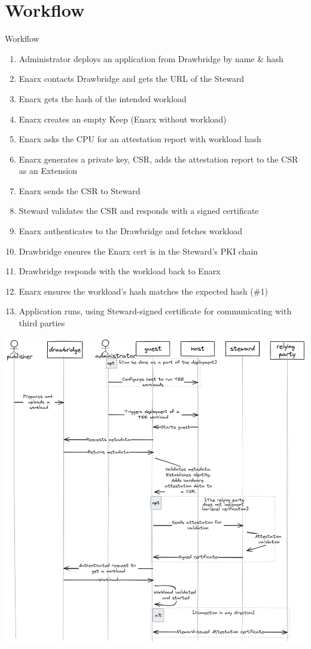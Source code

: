 \documentclass[graphics,compress]{beamer}
\begin{document}
\section{Workflow}
\begin{frame}{Workflow}
     {
        \begin{enumerate}
            \item Administrator deploys an application from Drawbridge by name \& hash
            \item Enarx contacts Drawbridge and gets the URL of the Steward
            \item Enarx gets the hash of the intended workload
            \item Enarx creates an empty Keep (Enarx without workload)
            \item Enarx asks the CPU for an attestation report with workload hash
            \item Enarx generates a private key, CSR, adds the attestation report to the CSR as an Extension
            \item Enarx sends the CSR to Steward
            \item Steward validates the CSR and responds with a signed certificate
            \item Enarx authenticates to the Drawbridge and fetches workload
            \item Drawbridge ensures the Enarx cert is in the Steward's PKI chain
            \item Drawbridge responds with the workload back to Enarx
            \item Enarx ensures the workload's hash matches the expected hash (\#1)
            \item Application runs, using Steward-signed certificate for communicating with third parties
        \end{enumerate}
    }
     {
        \centering
        \includegraphics[width=1.01\linewidth,height=0.71\linewidth]{images/attestation-flow-excalidraw.png}
    }
\end{frame}
\end{document}
